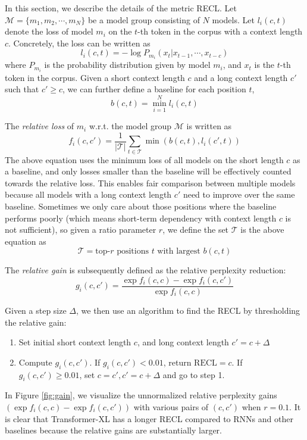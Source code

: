 \documentclass[11pt,a4paper]{article}
\begin{document}
In this section, we describe the details of the metric RECL. Let $\mathcal{M} = \{m_1, m_2, \cdots, m_N\}$ be a model group consisting of $N$ models. Let $l_i(c, t)$ denote the loss of model $m_i$ on the $t$-th token in the corpus with a context length $c$. Concretely, the loss can be written as
\[
l_i(c, t) = - \log P_{m_i}(x_t | x_{t - 1}, \cdots, x_{t - c})
\]
where $P_{m_i}$ is the probability distribution given by model $m_i$, and $x_t$ is the $t$-th token in the corpus. Given a short context length $c$ and a long context length $c'$ such that $c' \geq c$, we can further define a baseline for each position $t$,
\[b(c, t) = \min_{i = 1}^N l_i(c, t)\]

The \textit{relative loss} of $m_i$ w.r.t. the model group $\mathcal{M}$ is written as
\[
f_i(c, c') = \frac{1}{|\mathcal{T}|} \sum_{t \in \mathcal{T}} \min \left( b(c, t), l_i(c', t) \right)
\]
The above equation uses the minimum loss of all models on the short length $c$ as a baseline, and only losses smaller than the baseline will be effectively counted towards the relative loss. This enables fair comparison between multiple models because all models with a long context length $c'$ need to improve over the same baseline. Sometimes we only care about those positions where the baseline performs poorly (which means short-term dependency with context length $c$ is not sufficient), so given a ratio parameter $r$, we define the set $\mathcal{T}$ is the above equation as
\[\mathcal{T} = \text{top-}r \text{~positions~} t \text{~with largest~}b(c, t)\]

The \textit{relative gain} is subsequently defined as the relative perplexity reduction:
\[
g_i(c, c') = \frac{\exp f_i(c, c) - \exp f_i(c, c')}{\exp f_i(c, c)}
\]

Given a step size $\Delta$, we then use an algorithm to find the RECL by thresholding the relative gain:
\begin{enumerate}
	\item Set initial short context length $c$, and long context length $c' = c + \Delta$
	\item Compute $g_i(c, c')$. If $g_i(c, c') < 0.01$, return $\text{RECL} = c$. If $g_i(c, c') \geq 0.01$, set $c = c', c' = c + \Delta$ and go to step 1.
\end{enumerate}

In Figure \ref{fig:gain}, we visualize the unnormalized relative perplexity gains $(\exp f_i(c, c) - \exp f_i(c, c'))$ with various pairs of $(c, c')$ when $r = 0.1$. It is clear that Transformer-XL has a longer RECL compared to RNNs and other baselines because the relative gains are substantially larger.
\end{document}
